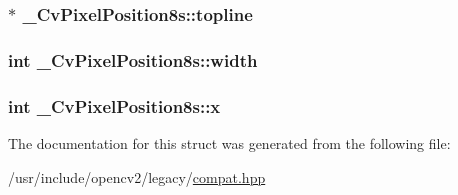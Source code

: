 \hypertarget{struct__CvPixelPosition8s_a2da220db28fedfab9f85118bd0900967}{
\subsubsection[{topline}]{$\ast$ \-\_\-\-Cv\-Pixel\-Position8s\-::topline}}\label{struct__CvPixelPosition8s_a2da220db28fedfab9f85118bd0900967}
\hypertarget{struct__CvPixelPosition8s_a8c9a89631cc3148df7a1f6e906f74e53}{
\subsubsection[{width}]{\setlength{\rightskip}{0pt plus 5cm}int \-\_\-\-Cv\-Pixel\-Position8s\-::width}}\label{struct__CvPixelPosition8s_a8c9a89631cc3148df7a1f6e906f74e53}
\hypertarget{struct__CvPixelPosition8s_af00dfdf2ebf04a50f68d9f186c1f8d25}{
\subsubsection[{x}]{\setlength{\rightskip}{0pt plus 5cm}int \-\_\-\-Cv\-Pixel\-Position8s\-::x}}\label{struct__CvPixelPosition8s_af00dfdf2ebf04a50f68d9f186c1f8d25}


The documentation for this struct was generated from the following file\-:\begin{DoxyCompactItemize}
\item 
/usr/include/opencv2/legacy/\hyperlink{compat_8hpp}{compat.\-hpp}\end{DoxyCompactItemize}
